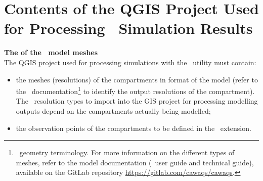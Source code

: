 
\section{Contents of the QGIS Project Used for Processing \cawaqs~Simulation Results}
\label{sec-res-cawaqs}

\textbf{{The  of the \cawaqs~model meshes}}\\
The QGIS project used for processing simulations with the \cwv~utility
must contain:
\begin{itemize}
    \item the meshes (resolutions) of the compartments in 
        format of the model (refer to the \cawaqs~documentation\footnote{\cawaqs~geometry terminology. For more information on the different types of meshes,
        refer to the model documentation (\ie~user guide and technical guide),
        available on the GitLab repository \href{https://gitlab.com/cawaqs/cawaqs}{https://gitlab.com/cawaqs/cawaqs}.}
        to identify the output resolutions of the  compartment).
        The \cawaqs~resolution types to import into the GIS project for
        processing modelling outputs depend on the compartments
        actually being modelled;

    \item the observation points of the compartments to be defined in the \cwv~extension.
\end{itemize}

